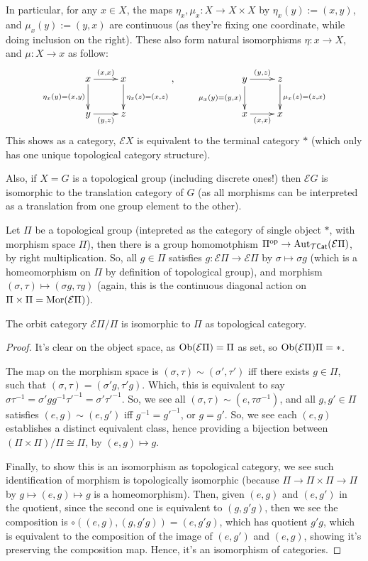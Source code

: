 \documentclass{article}
\begin{document}
In particular, for any $x\in X$, the maps $\eta_x,\mu_x:X\rightarrow X\times X$ by $\eta_x (y):= (x,y)$, and $\mu_x(y) := (y,x)$ are continuous (as they're fixing one coordinate, while doing inclusion on the right). These also form natural isomorphisms $\eta:x\rightarrow X$, and $\mu:X\rightarrow x$ as follow:
\[\xymatrix{
    x \ar[d]_-{\eta_x (y) = (x,y)} \ar[r]^-{(x,x)} & x \ar[d]^-{\eta_x (z)=(x,z)}\\
    y \ar[r]_-{(y,z)} & z
},\quad\quad\xymatrix{
    y \ar[d]_-{\mu_x(y)=(y,x)} \ar[r]^-{(y,z)} & z\ar[d]^-{\mu_x(z)=(z,x)}\\
    x \ar[r]_-{(x,x)} & x
}\]
This shows as a category, $\mathcal{E}X$ is equivalent to the terminal category $*$ (which only has one unique topological category structure).

Also, if $X=G$ is a topological group (including discrete ones!) then $\mathcal{E}G$ is isomorphic to the translation category of $G$ (as all morphisms can be interpreted as a translation from one group element to the other).

\hfil

Let $\Pi$ be a topological group (intepreted as the category of single object $*$, with morphism space $\Pi$), then there is a group homomotphism $\Pi^{\mathrm{op}}\rightarrow \mathrm{Aut}_{\mathcal{T}\mathsf{Cat}}(\mathcal{E}\Pi)$, by right multiplication. So, all $g\in \Pi$ satisfies $g:\mathcal{E}\Pi\rightarrow\mathcal{E}\Pi$ by $\sigma\mapsto \sigma g$ (which is a homeomorphism on $\Pi$ by definition of topological group), and morphism $(\sigma,\tau)\mapsto (\sigma g,\tau g)$ (again, this is the continuous diagonal action on $\Pi\times\Pi = \mathrm{Mor}(\mathcal{E}\Pi)$).

\begin{prop}
    The orbit category $\mathcal{E}\Pi/\Pi$ is isomorphic to $\Pi$ as topological category.
\end{prop}
\begin{proof}
    It's clear on the object space, as $\mathrm{Ob}(\mathcal{E}\Pi)=\Pi$ as set, so $\mathrm{Ob}(\mathcal{E}\Pi)\/\Pi = *$.

    The map on the morphism space is $(\sigma,\tau)\sim (\sigma',\tau')$ iff there exists $g\in \Pi$, such that $(\sigma,\tau)=(\sigma'g,\tau'g)$. Which, this is equivalent to say $\sigma\tau^{-1} = \sigma'g g^{-1}\tau'^{-1}= \sigma'\tau'^{-1}$. So, we see all $(\sigma,\tau)\sim (e,\tau\sigma^{-1})$, and all $g,g'\in\Pi$ satisfies $(e,g)\sim(e,g')$ iff $g^{-1}=g'^{-1}$, or $g=g'$. So, we see each $(e,g)$ establishes a distinct equivalent class, hence providing a bijection between $(\Pi\times \Pi)/\Pi\cong\Pi$, by $(e,g)\mapsto g$.

    Finally, to show this is an isomorphism as topological category, we see such identification of morphism is topologically isomorphic (because $\Pi\rightarrow \Pi\times\Pi \rightarrow \Pi$ by $g\mapsto (e,g)\mapsto g$ is a homeomorphism). Then, given $(e,g)$ and $(e,g')$ in the quotient, since the second one is equivalent to $(g,g'g)$, then we see the composition is $\circ((e,g),(g,g'g)) = (e,g'g)$, which has quotient $g'g$, which is equivalent to the composition of the image of $(e,g')$ and $(e,g)$, showing it's preserving the composition map. Hence, it's an isomorphism of categories.
\end{proof}
\end{document}
